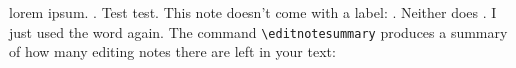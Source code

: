 \documentclass{article}
\begin{document}
 lorem ipsum.
.
Test test.
This note doesn't come with a label: .
Neither does .
I just used the word  again.
The command \texttt{\textbackslash{}editnotesummary} produces a summary of how many editing notes there are left in your text:
\editnotesummary
\end{document}
